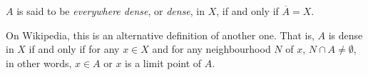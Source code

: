 \begin{definition}
	$A$ is said to be \textit{everywhere dense}, or \textit{dense}, in $X$, if and only if $\overline A = X$.
\end{definition}


\begin{note}
	On Wikipedia, this is an alternative definition of another one. That is, $A$ is dense in $X$ if and only if for any $x \in X$ and for any neighbourhood $N$ of $x$, $N \cap A \ne \emptyset$, in other words, $x \in A$ or $x$ is a limit point of $A$.
\end{note}































%